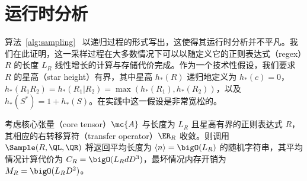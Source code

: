 \section{运行时分析}
\label{sec:appendix_c}

算法~\ref{alg:sampling} 
\ 以递归过程的形式写出，这使得其运行时分析并不平凡。我们在此证明，这一采样过程在大多数情况下可以以随定义它的正则表达式（regex）$R$ 的长度 $L_R$ 线性增长的计算与存储代价完成。作为一个技术性假设，我们要求 $R$ 的星高（star height）有界，其中星高 $h_*(R)$ 递归地定义为 $h_*(c) = 0$，$h_*(R_1 R_2) = h_*(R_1 | R_2) = \max(h_*(R_1), h_*(R_2))$，以及 $h_*(S^*) = 1 + h_*(S)$。在实践中这一假设是非常宽松的。

\begin{theorem}
\label{thm:runtime}

考虑核心张量（core tensor）$\mc{A}$ 与长度为 $L_R$ 且星高有界的正则表达式 $R$，其相应的右转移算符（transfer operator）$\ER_R$ 收敛。则调用 $\Sample(R, \QL, \QR)$ 将返回平均长度为 $\langle n \rangle = \bigO(L_R)$ 的随机字符串，其平均情况计算代价为 $C_R = \bigO(L_R d D^3)$，最坏情况内存开销为 $M_R = \bigO(L_R D^2)$。

\end{theorem}


